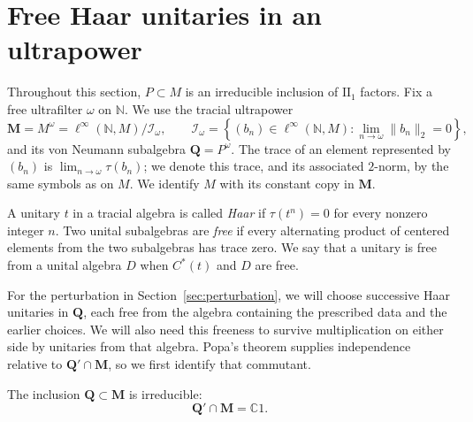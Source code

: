 \section{Free Haar unitaries in an ultrapower}
\label{sec:independence}

Throughout this section, $P\subset M$ is an irreducible inclusion of
$\mathrm{II}_1$ factors.  Fix a free ultrafilter $\omega$ on
$\mathbb N$.  We use the tracial
ultrapower
\[
  \mathbf M=M^\omega
  =\ell^\infty(\mathbb N,M)/\mathcal I_\omega,
  \qquad
  \mathcal I_\omega
  =\left\{(b_n)\in\ell^\infty(\mathbb N,M):
       \lim_{n\to\omega}\|b_n\|_2=0\right\},
\]
and its von Neumann subalgebra $\mathbf Q=P^\omega$.  The trace of an
element represented by $(b_n)$ is $\lim_{n\to\omega}\tau(b_n)$; we
denote this trace, and its associated $2$-norm, by the same symbols as
on $M$.  We identify $M$ with its constant copy in $\mathbf M$.

A unitary $t$ in a tracial algebra is called \emph{Haar} if
$\tau(t^n)=0$ for every nonzero integer $n$.  Two unital subalgebras
are \emph{free} if every alternating product of centered elements
from the two subalgebras has trace zero.  We say that a unitary is
free from a unital algebra $D$ when $C^*(t)$ and $D$ are free.

For the perturbation in Section~\ref{sec:perturbation}, we will choose
successive Haar unitaries in $\mathbf Q$, each free from the algebra
containing the prescribed data and the earlier choices.  We will also
need this freeness to survive multiplication on either side by unitaries
from that algebra.  Popa's theorem supplies independence relative to
$\mathbf Q'\cap\mathbf M$, so we first identify that commutant.

\begin{lemma}
\label{lem:ultrapower-commutant}
The inclusion $\mathbf Q\subset\mathbf M$ is irreducible:
\[
  \mathbf Q'\cap\mathbf M=\mathbb C1.
\]
\end{lemma}

